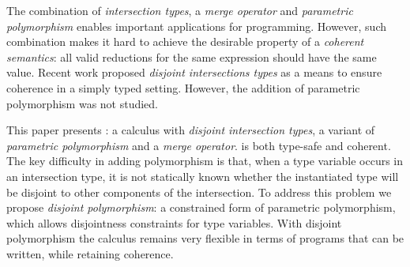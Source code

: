 The combination of \emph{intersection types}, a \emph{merge operator} 
and \emph{parametric polymorphism} enables
important applications for programming. However, such combination makes
it hard to achieve the desirable property of a \emph{coherent
semantics}: all valid reductions for the same expression should
have the same value. Recent work proposed \emph{disjoint
intersections types} as a means to ensure coherence in a simply typed
setting. However, the addition of parametric polymorphism was not
studied.

This paper presents \name: a calculus with 
\emph{disjoint intersection types}, a variant of \emph{parametric polymorphism} and a
\emph{merge operator}. \name is both type-safe and
coherent. The key difficulty in adding polymorphism is that, when a type variable occurs in an intersection
type, it is not statically known whether the instantiated type will be
disjoint to other components of the intersection. To address this
problem we propose \emph{disjoint polymorphism}: a constrained form of
parametric polymorphism, which allows 
disjointness constraints for type variables. With disjoint
polymorphism the calculus remains very flexible in terms of programs
that can be written, while retaining coherence.

\begin{comment}
Coherence is achieved by ensuring that intersection types
are \emph{disjoint}. The approach works in the presence of parametric
polymorphism. However, parametric polymorphism makes the problem of coherence
significantly harder. When a type variable occurs in an intersection
type, it is not statically known whether the instantiated type will
be disjoint to other components of the intersection.
To address this problem we propose \emph{disjoint polymorphism}: a
constrained form of parametric polymorphism, that allows programmers
to specify disjointness constraints for type variables. With disjoint
polymorphism the calculus remains very flexible in terms of programs
that can be written with intersection types, while retaining coherence.
\end{comment}
